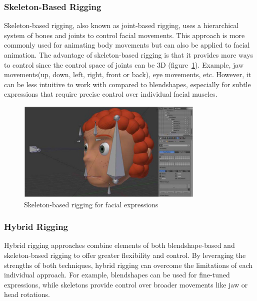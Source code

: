 \documentclass[../../main]{subfiles}
\begin{document}
\subsubsection{Skeleton-Based Rigging}
\label{ch:facial_expressions:related_work:face_rigging:skeleton_based_rigging}

Skeleton-based rigging, also known as joint-based rigging, uses a hierarchical system of bones and joints to control facial movements. This approach is more commonly used for animating body movements but can also be applied to facial animation. The advantage of skeleton-based rigging is that it provides more ways to control since the control space of joints can be 3D (figure~\ref{ch:facial_expressions:fig:skeleton_based_rigging}). Example, jaw movements(up, down, left, right, front or back), eye movements, etc. However, it can be less intuitive to work with compared to blendshapes, especially for subtle expressions that require precise control over individual facial muscles.

\begin{figure}
    \centering
    \includegraphics[width=0.8\textwidth]{chapters/facial_expressions/images/skeleton_based_rigging.png}
    \caption{Skeleton-based rigging for facial expressions}
    \label{ch:facial_expressions:fig:skeleton_based_rigging}
\end{figure}

\subsubsection{Hybrid Rigging}
\label{ch:facial_expressions:related_work:face_rigging:hybrid_rigging}

Hybrid rigging approaches combine elements of both blendshape-based and skeleton-based rigging to offer greater flexibility and control. By leveraging the strengths of both techniques, hybrid rigging can overcome the limitations of each individual approach. For example, blendshapes can be used for fine-tuned expressions, while skeletons provide control over broader movements like jaw or head rotations. 
\end{document}
